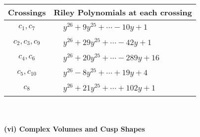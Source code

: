 \documentclass[1p]{elsarticle_modified}
\theoremstyle{definition}
\begin{document}
\begin{tabular}{m{50pt}|m{274pt}}
Crossings & \hspace{64pt}Riley Polynomials at each crossing \\
\hline $$\begin{aligned}c_{1},c_{7}\end{aligned}$$&$\begin{aligned}
&y^{26}+9 y^{25}+\cdots-10 y+1
\end{aligned}$\\
\hline $$\begin{aligned}c_{2},c_{3},c_{9}\end{aligned}$$&$\begin{aligned}
&y^{26}+29 y^{25}+\cdots-42 y+1
\end{aligned}$\\
\hline $$\begin{aligned}c_{4},c_{6}\end{aligned}$$&$\begin{aligned}
&y^{26}+20 y^{25}+\cdots-289 y+16
\end{aligned}$\\
\hline $$\begin{aligned}c_{5},c_{10}\end{aligned}$$&$\begin{aligned}
&y^{26}-8 y^{25}+\cdots+19 y+4
\end{aligned}$\\
\hline $$\begin{aligned}c_{8}\end{aligned}$$&$\begin{aligned}
&y^{26}+21 y^{25}+\cdots+102 y+1
\end{aligned}$\\
\hline
\end{tabular}\\~\\
\newpage\flushleft \textbf{(vi) Complex Volumes and Cusp Shapes}
\end{document}
